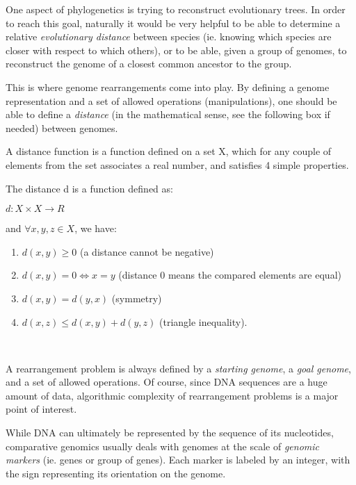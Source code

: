 \documentclass[11pt,final,twoside,nofrench]{thlifl}
\begin{document}
One aspect of phylogenetics is trying to reconstruct evolutionary trees.
In order to reach this goal, naturally it would be very helpful to be able to determine a relative \emph{evolutionary distance} between species (ie. knowing which species are closer with respect to which others), or to be able, given a group of genomes, to reconstruct the genome of a closest common ancestor to the group.

This is where genome rearrangements come into play. By defining a genome representation and a set of allowed operations (manipulations), one should be able to define a \emph{distance} (in the mathematical sense, see the following box if needed) between genomes.

\begin{framed}

A distance function is a function defined on a set X, which for any couple of elements from the set associates a real number, and satisfies 4 simple properties.

The distance d is a function defined as:

$d : X \times X \rightarrow R$

and $\forall x, y, z \in X$, we have:
\begin{enumerate}
\item $d(x,y) \geq 0$ (a distance cannot be negative)

\item $d(x,y) = 0   \iff  x = y$ (distance 0 means the compared elements are equal)

\item $d(x,y) = d(y,x)$     (symmetry)

\item $d(x,z) \leq d(x,y) + d(y,z)$  (triangle inequality).
\end{enumerate}

\end{framed}

~~

A rearrangement problem is always defined by a \emph{starting genome}, a \emph{goal genome}, and a set of allowed operations. Of course, since DNA sequences are a huge amount of data, algorithmic complexity of rearrangement problems is a major point of interest.

While DNA can ultimately be represented by the sequence of its nucleotides, comparative genomics usually deals with genomes at the scale of \emph{genomic markers} (ie. genes or group of genes). Each marker is labeled by an integer, with the sign representing its orientation on the genome.
\end{document}
